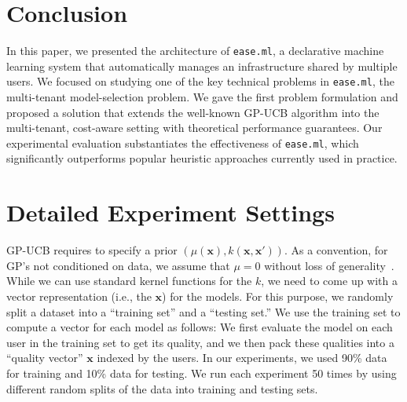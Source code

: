 \documentclass[letterpaper]{vldb}
\newcommand{\eml}{\texttt{ease.ml}\xspace}
\begin{document}
\vspace{-1em}
\section{Conclusion}\label{sec:conclusion}
\vspace{-0.5em}
In this paper, we presented the architecture of \eml, a declarative machine learning system that automatically manages an infrastructure shared by multiple users.
We focused on studying one of the key technical problems in \eml, the multi-tenant model-selection problem.
We gave the first problem formulation and proposed a solution that extends the well-known GP-UCB algorithm into the multi-tenant, cost-aware setting with theoretical performance guarantees.
Our experimental evaluation substantiates the effectiveness of \eml, which significantly outperforms popular heuristic approaches currently used in practice. %




\newpage

\balance

  



%
%
%
%
%
%
%
%
%
%
%
%
%
%
%
%
%
%
%
%
%
%
%
%
%
%
%
%
%
%
%
%
%
%
%
%
%
%
%
%
%
%
%
%
%
%



\iffalse

\appendix


\section{Detailed Experiment Settings}

GP-UCB requires to specify a prior $(\mu(\mathbf{x}), k(\mathbf{x},\mathbf{x}'))$.
As a convention, for GP's not conditioned on data, we assume that $\mu=0$ without loss of generality~\cite{SrinivasKKS10}.
While we can use standard kernel functions for the $k$, we need to come up with a vector representation (i.e., the $\mathbf{x}$) for the models.
For this purpose, we randomly split a dataset into a ``training set'' and a ``testing set.''
We use the training set to compute a vector for each model as follows:
We first evaluate the model on each user in the training set to get its quality, and we then pack these qualities into a ``quality vector'' $\mathbf{x}$ indexed by the users.
In our experiments, we used 90\% data for training and 10\% data for testing.
We run each experiment 50 times by using different random splits of the data into training and testing sets.
\end{document}
